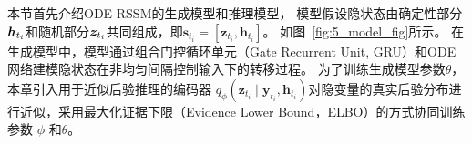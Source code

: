 本节首先介绍ODE-RSSM的生成模型和推理模型，
模型假设隐状态由确定性部分$\boldsymbol{h}_{t_i}$和随机部分$\boldsymbol{z}_{t_i}$共同组成，即$\boldsymbol{s}_{t_{i}}=[\boldsymbol{z}_{t_{i}},\boldsymbol{h}_{t_{i}}]$。
如图~\ref{fig:5_model_fig}所示。
在生成模型中，模型通过组合门控循环单元（Gate Recurrent Unit, GRU）和ODE网络建模隐状态在非均匀间隔控制输入下的转移过程。
为了训练生成模型参数$\theta$， 本章引入用于近似后验推理的编码器 $q_{\phi}\left(\boldsymbol{z}_{t_i} \mid \boldsymbol{y}_{t_i}, \boldsymbol{h}_{t_i}\right)$对隐变量的真实后验分布进行近似，采用最大化证据下限（Evidence Lower Bound，ELBO）的方式协同训练参数 $\phi$ 和$\theta$。






